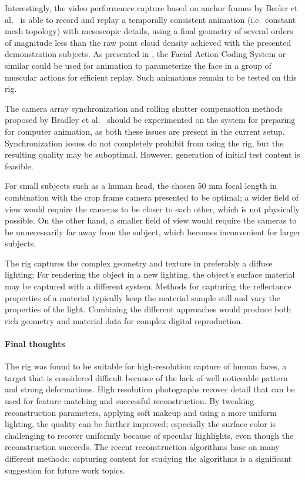 Interestingly, the video performance capture based on anchor frames by Beeler et al.\ \cite{beeler2011high} is able to record and replay a temporally consistent animation (i.e.\ constant mesh topology) with mesoscopic details, using a final geometry of several orders of magnitude less than the raw point cloud density achieved with the presented demonstration subjects.
As presented in \cite{deng2007computer}, the Facial Action Coding System or similar could be used for animation to parameterize the face in a group of muscular actions for efficient replay.
Such animations remain to be tested on this rig.

The camera array synchronization and rolling shutter compensation methods proposed by Bradley et al.\ \cite{bradley2009synchronization} should be experimented on the system for preparing for computer animation, as both these issues are present in the current setup.
Synchronization issues do not completely prohibit from using the rig, but the resulting quality may be suboptimal.
However, generation of initial test content is feasible.

For small subjects such as a human head, the chosen 50 mm focal length in combination with the crop frame camera presented to be optimal; a wider field of view would require the cameras to be closer to each other, which is not physically possible.
On the other hand, a smaller field of view would require the cameras to be unnecessarily far away from the subject, which becomes inconvenient for larger subjects.

The rig captures the complex geometry and texture in preferably a diffuse lighting;
For rendering the object in a new lighting, the object's surface material may be captured with a different system.
Methods for capturing the reflectance properties of a material typically keep the material sample still and vary the properties of the light. \cite{debevec2000acquiring} \cite{aittala2013practical}
Combining the different approaches would produce both rich geometry and material data for complex digital reproduction.

\paragraph{Final thoughts}
The rig was found to be suitable for high-resolution capture of human faces, a target that is considered difficult because of the lack of well noticeable pattern and strong deformations.
High resolution photographs recover detail that can be used for feature matching and successful reconstruction.
By tweaking reconstruction parameters, applying soft makeup and using a more uniform lighting, the quality can be further improved;
especially the surface color is challenging to recover uniformly because of specular highlights, even though the reconstruction succeeds.
The recent reconstruction algorithms base on many different methods; capturing content for studying the algorithms is a significant suggestion for future work topics.

